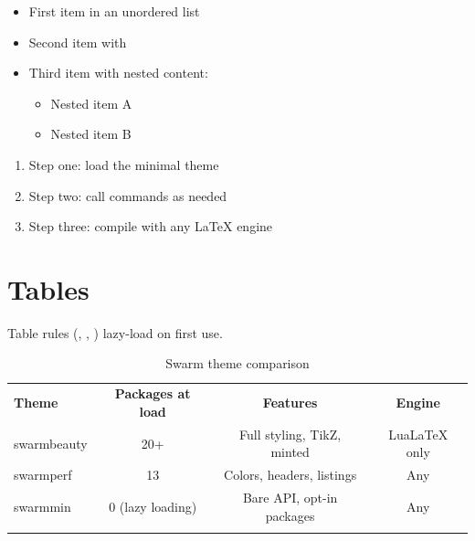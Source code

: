 \documentclass[11pt, a4paper]{article}
\begin{document}
\begin{itemize}[itemsep=4pt, leftmargin=1.2em]
  \item First item in an unordered list
  \item Second item with 
  \item Third item with nested content:
    \begin{itemize}[itemsep=2pt, leftmargin=1.2em]
      \item Nested item A
      \item Nested item B
    \end{itemize}
\end{itemize}

\begin{enumerate}[itemsep=4pt, leftmargin=1.5em]
  \item Step one: load the minimal theme
  \item Step two: call  commands as needed
  \item Step three: compile with any LaTeX engine
\end{enumerate}



\section{Tables}

Table rules (, ,
) lazy-load  on first use.

\begin{table}[h]
  \centering
  \caption{Swarm theme comparison}
  \label{tab:comparison}
  \begin{tabular}{l c c c}
    \swarmtoprule
    \textbf{Theme} & \textbf{Packages at load} & \textbf{Features} & \textbf{Engine} \\
    \swarmmidrule
    swarmbeauty & 20+                & Full styling, TikZ, minted & LuaLaTeX only \\
    swarmperf   & 13                 & Colors, headers, listings  & Any           \\
    swarmmin    & 0 (lazy loading)   & Bare API, opt-in packages  & Any           \\
    \swarmbottomrule
  \end{tabular}
\end{table}
\end{document}
